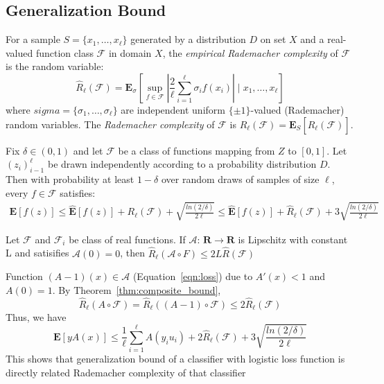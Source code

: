 \documentclass[9pt]{article}
\begin{document}

\subsection{Generalization Bound}
\label{sec:bound}
\begin{definition}
   \label{def:rademacher}
   For a sample $S=\{x_1,\ldots,x_\ell\}$ generated by a distribution $D$ on set $X$ and a 
   real-valued function class $\mathcal{F}$ in domain $X$, the 
   {\it empirical Rademacher complexity} of $\mathcal{F}$ is the random variable:
   $$
   \hat{R}_\ell\left(\mathcal{F}\right) = 
   {\mathbf{E}}_\sigma\left[
      \sup_{f\in\mathcal{F}}|\frac{2}{\ell}\sum_{i=1}^\ell\sigma_if(x_i)| \mid x_1,\ldots,x_\ell
   \right]
   $$
   where $sigma=\{\sigma_1,\ldots,\sigma_\ell \}$ are independent uniform $\{\pm1\}$-valued
   (Rademacher) random variables.
   The {\it Rademacher complexity} of $\mathcal{F}$ is 
   $R_\ell(\mathcal{F})=\mathbf{E}_S\left[ \hat{R}_\ell\left(\mathcal{F}\right)\right]$.
\end{definition}

\begin{theorem}
   \label{thm:bound}
   Fix $\delta\in(0,1)$ and let $\mathcal{F}$ be a class of functions mapping from $Z$ to $[0,1]$.
   Let $(z_i)^\ell_{i-1}$ be drawn independently according to a probability distribution $D$.
   Then with probability at least $1-\delta$ over random draws of samples of size $\ell$, every
   $f\in\mathcal{F}$ satisfies:
   \begin{eqnarray*}
      \mathbf{E}\left[f(z)\right] \leq 
      \mathbf{\hat{E}}\left[f(z)\right] + R_\ell(\mathcal{F})
      +\sqrt{\frac{ln\left(2/\delta\right)}{2\ell}}
      \leq
      \mathbf{\hat{E}}\left[f(z)\right] + \hat{R}_\ell(\mathcal{F})
      +3\sqrt{\frac{ln\left(2/\delta\right)}{2\ell}}
   \end{eqnarray*}
\end{theorem}

\begin{theorem}
   \label{thm:composite_bound}
   Let $\mathcal{F}$ and $\mathcal{F}_i$ be class of real functions. 
         If $\mathcal{A}$:
         $\mathbf{R}\rightarrow\mathbf{R}$
         is Lipschitz with constant L and satisifies $\mathcal{A}(0)=0$, then
         $\hat{R}_\ell(\mathcal{A}\circ F)\leq 2L\hat{R}(\mathcal{F})$
\end{theorem}
\begin{remark}
   Function $(A-1)(x)\in \mathcal{A}$ (Equation~\ref{eqn:loss})
   due to $A'(x)<1$ and $A(0)=1$. By Theorem~\ref{thm:composite_bound},
   $$
   \hat{R}_\ell(A\circ \mathcal{F}) = \hat{R}_\ell((A-1)\circ \mathcal{F}) 
   \leq 2\hat{R}_\ell(\mathcal{F})
   $$
   Thus, we have
   $$
   \mathbf{E}[yA(x)]
   \leq \frac{1}{\ell}\sum_{i=1}^\ell A(y_iu_i) + 
   2\hat{R}_\ell(\mathcal{F})
      +3\sqrt{\frac{ln\left(2/\delta\right)}{2\ell}}
   $$
   This shows that generalization bound of a classifier with logistic loss function
   is directly related Rademacher complexity of that classifier 
\end{remark}
\end{document}
